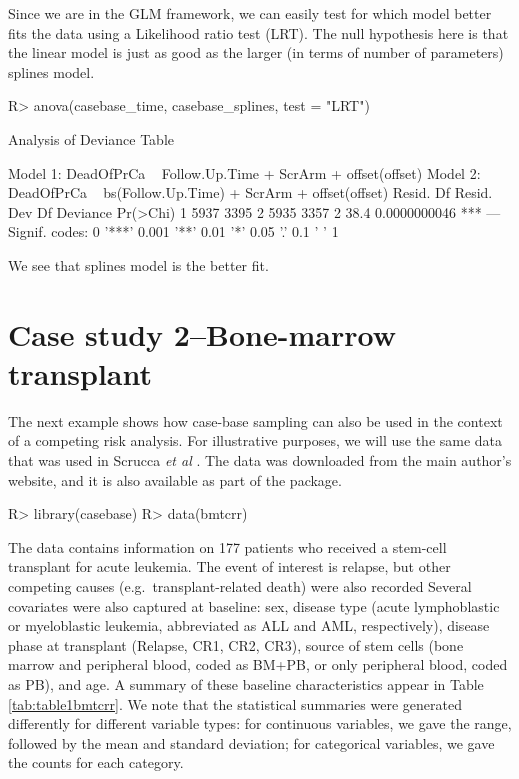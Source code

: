 \documentclass[article]{jss}
\begin{document}
Since we are in the GLM framework, we can easily test for which model
better fits the data using a Likelihood ratio test (LRT). The null
hypothesis here is that the linear model is just as good as the larger
(in terms of number of parameters) splines model.

\begin{CodeChunk}

\begin{CodeInput}
R> anova(casebase_time, casebase_splines, test = "LRT")
\end{CodeInput}

\begin{CodeOutput}
Analysis of Deviance Table

Model 1: DeadOfPrCa ~ Follow.Up.Time + ScrArm + offset(offset)
Model 2: DeadOfPrCa ~ bs(Follow.Up.Time) + ScrArm + offset(offset)
  Resid. Df Resid. Dev Df Deviance     Pr(>Chi)    
1      5937       3395                             
2      5935       3357  2     38.4 0.0000000046 ***
---
Signif. codes:  0 '***' 0.001 '**' 0.01 '*' 0.05 '.' 0.1 ' ' 1
\end{CodeOutput}
\end{CodeChunk}

We see that splines model is the better fit.

\section{Case study 2--Bone-marrow
transplant}\label{case-study-2bone-marrow-transplant}

The next example shows how case-base sampling can also be used in the
context of a competing risk analysis. For illustrative purposes, we will
use the same data that was used in Scrucca \emph{et al}
\citeyearpar{scrucca2010regression}. The data was downloaded from the
main author's website, and it is also available as part of the
 package.

\begin{CodeChunk}

\begin{CodeInput}
R> library(casebase)
R> data(bmtcrr)
\end{CodeInput}
\end{CodeChunk}

The data contains information on 177 patients who received a stem-cell
transplant for acute leukemia. The event of interest is relapse, but
other competing causes (e.g.~transplant-related death) were also
recorded Several covariates were also captured at baseline: sex, disease
type (acute lymphoblastic or myeloblastic leukemia, abbreviated as ALL
and AML, respectively), disease phase at transplant (Relapse, CR1, CR2,
CR3), source of stem cells (bone marrow and peripheral blood, coded as
BM+PB, or only peripheral blood, coded as PB), and age. A summary of
these baseline characteristics appear in Table \ref{tab:table1bmtcrr}.
We note that the statistical summaries were generated differently for
different variable types: for continuous variables, we gave the range,
followed by the mean and standard deviation; for categorical variables,
we gave the counts for each category.
\end{document}
